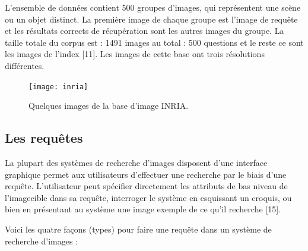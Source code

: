 L’ensemble de données contient 500 groupes d’images, qui représentent une scène ou un objet distinct. La première image de chaque groupe est l’image de requête et les résultats corrects de récupération sont les autres images du groupe. La taille totale du corpus est : 1491 images au total : 500 questions et le reste ce sont les images de l’index [11]. Les images de cette base ont trois résolutions différentes.

\begin{figure}[H]
	\centering
	\texttt{[image: inria]} 
	\caption{Quelques images de la base d’image INRIA.}
\end{figure}


\subsection{Les requêtes}
La plupart des systèmes de recherche d’images disposent d'une interface graphique permet aux utilisateurs d'effectuer une recherche par le biais d'une requête. L’utilisateur peut spécifier directement les attributs de bas niveau de l'imagecible dans sa requête, interroger le système en esquissant un croquis, ou bien en présentant au système une image exemple de ce qu'il recherche [15].

Voici les quatre façons (types) pour faire une requête dans un système de recherche d'images :


